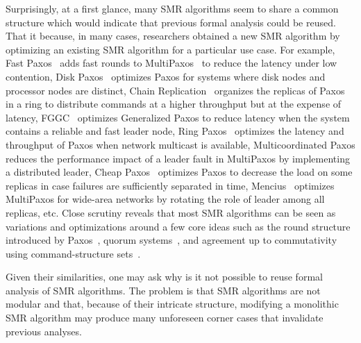 Surprisingly, at a first glance, many SMR algorithms seem to share a common structure which would indicate that previous formal analysis could be reused. 
That it because, in many cases, researchers obtained a new SMR algorithm by optimizing an existing SMR algorithm for a particular use case.
For example, Fast Paxos~\cite{Lamport06FastPaxos} adds fast rounds to MultiPaxos~\cite{lamport2001paxos} to reduce the latency under low contention, 
Disk Paxos~\cite{GafniLamport03DiskPaxos} optimizes Paxos for systems where disk nodes and processor nodes are distinct, 
Chain Replication~\cite{RenesseSchneider04ChainReplicationSupportingHighThroughputAvailability} organizes the replicas of Paxos in a ring to distribute commands at a higher throughput but at the expense of latency, 
FGGC~\cite{SutraShapiro11FastGenuineGeneralizedConsensus} optimizes Generalized Paxos\cite{Lamport05GeneralizeConsensus} to reduce latency when the system contains a reliable and fast leader node, 
Ring Paxos~\cite{MarandiETAL10RingPaxosHighthroughputAtomicBroadcastProtocol} optimizes the latency and throughput of Paxos when network multicast is available, 
Multicoordinated Paxos reduces the performance impact of a leader fault in MultiPaxos by implementing a distributed leader, 
Cheap Paxos~\cite{LamportMassa04CheapPaxos} optimizes Paxos to decrease the load on some replicas in case failures are sufficiently separated in time,
Mencius~\cite{MaoJunqueiraMarzullo08MenciusBuildingEfficientReplicatedStateMachine} optimizes MultiPaxos for wide-area networks by rotating the role of leader among all replicas, etc.
Close scrutiny reveals that most SMR algorithms can be seen as variations and optimizations around a few core ideas such as the round structure introduced by Paxos~\cite{Lamport98ParttimeParliament}, quorum systems~\cite{GuerraouiVukolic10RefinedQuorumSystems,Lamport06FastPaxos}, and agreement up to commutativity using command-structure sets~\cite{Lamport05GeneralizeConsensus}.

Given their similarities, one may ask why is it not possible to reuse formal analysis of SMR algorithms.
The problem is that SMR algorithms are not modular and that, because of their intricate structure, modifying a monolithic SMR algorithm may produce many unforeseen corner cases that invalidate previous analyses. 

